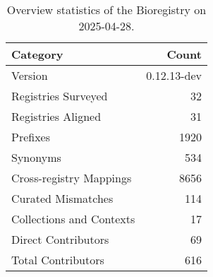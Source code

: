 \begin{table}
\caption{Overview statistics of the Bioregistry on 2025-04-28.}
\label{tab:bioregistry-summary}
\begin{tabular}{lr}
\toprule
Category & Count \\
\midrule
Version & 0.12.13-dev \\
Registries Surveyed & 32 \\
Registries Aligned & 31 \\
Prefixes & 1920 \\
Synonyms & 534 \\
Cross-registry Mappings & 8656 \\
Curated Mismatches & 114 \\
Collections and Contexts & 17 \\
Direct Contributors & 69 \\
Total Contributors & 616 \\
\bottomrule
\end{tabular}
\end{table}
